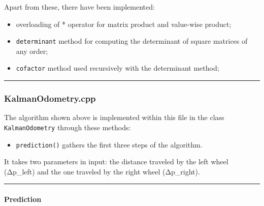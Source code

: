 \begin{Shaded}
\begin{Highlighting}[]
\OperatorTok{(}\OperatorTok{{-}\textgreater{}}\OperatorTok{,}\OperatorTok{{-}\textgreater{}}\OperatorTok{,}\OperatorTok{);}
\OperatorTok{=}\OperatorTok{();}
            \OperatorTok{*} \OperatorTok{(}\OperatorTok{/}\OperatorTok{);}
        \OperatorTok{\}}
\end{Highlighting}
\end{Shaded}

Apart from these, there have been implemented:

\begin{itemize}
\tightlist
\item
  overloading of * operator for matrix product and value-wise product;
\item
  \texttt{determinant} method for computing the determinant of square
  matrices of any order;
\item
  \texttt{cofactor} method used recursively with the determinant method;
\end{itemize}

\begin{center}\rule{0.5\linewidth}{0.5pt}\end{center}

\hypertarget{kalmanodometry.cpp}{%
\subsubsection{KalmanOdometry.cpp}\label{kalmanodometry.cpp}}

The algorithm shown above is implemented within this file in the class
\texttt{KalmanOdometry} through these methods:

\begin{itemize}
\tightlist
\item
  \texttt{prediction()} gathers the first three steps of the algorithm.
\end{itemize}

It takes two parameters in input: the distance traveled by the left
wheel (Δp\_left) and the one traveled by the right wheel (Δp\_right).

\begin{center}\rule{0.5\linewidth}{0.5pt}\end{center}

\hypertarget{prediction}{%
\paragraph{Prediction}\label{prediction}}

